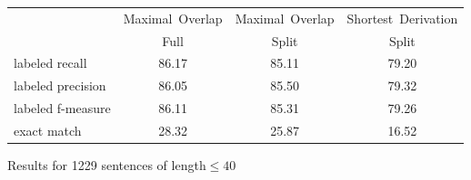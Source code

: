 %
%
%


\begin{tabular}{l | ccc}
&Maximal~Overlap&Maximal~Overlap&Shortest~Derivation\\
& Full& Split&Split\\\hline
labeled recall&		86.17&	85.11&	79.20\\
labeled precision&		86.05&	85.50&	79.32\\
labeled f-measure&		86.11&	85.31&	79.26\\
exact match&		28.32&	25.87&	16.52\\
\end{tabular}

\caption{Results for 1229 sentences of length$\leq 40$}

